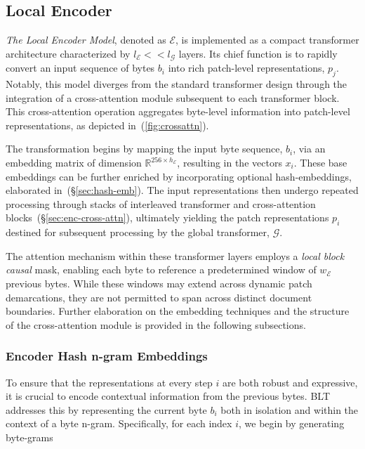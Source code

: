 \subsection{Local Encoder}
\label{section:local}

\textit{The Local Encoder Model}, denoted as $\mathcal{E}$, is implemented as a compact transformer architecture characterized by $l_{\mathcal{E}} << l_{\mathcal{G}}$ layers. Its chief function is to rapidly convert an input sequence of bytes $b_i$ into rich patch-level representations, $p_j$. Notably, this model diverges from the standard transformer design through the integration of a cross-attention module subsequent to each transformer block. This cross-attention operation aggregates byte-level information into patch-level representations, as depicted in~(\autoref{fig:crossattn}).

The transformation begins by mapping the input byte sequence, $b_i$, via an embedding matrix of dimension $\mathbb{R}^{256 \times h_{\mathcal{E}}}$, resulting in the vectors $x_i$. These base embeddings can be further enriched by incorporating optional hash-embeddings, elaborated in~(\S\ref{sec:hash-emb}). The input representations then undergo repeated processing through stacks of interleaved transformer and cross-attention blocks~(\S\ref{sec:enc-cross-attn}), ultimately yielding the patch representations $p_i$ destined for subsequent processing by the global transformer, $\mathcal{G}$.

The attention mechanism within these transformer layers employs a \textit{local block causal} mask, enabling each byte to reference a predetermined window of $w_{\mathcal{E}}$ previous bytes. While these windows may extend across dynamic patch demarcations, they are not permitted to span across distinct document boundaries. Further elaboration on the embedding techniques and the structure of the cross-attention module is provided in the following subsections.

\subsubsection{Encoder Hash n-gram Embeddings}
\label{sec:ngram-emb}
\label{sec:hash-emb}
To ensure that the representations at every step $i$ are both robust and expressive, it is crucial to encode contextual information from the previous bytes. {\textsc BLT} addresses this by representing the current byte $b_i$ both in isolation and within the context of a byte n-gram. Specifically, for each index $i$, we begin by generating byte-grams

